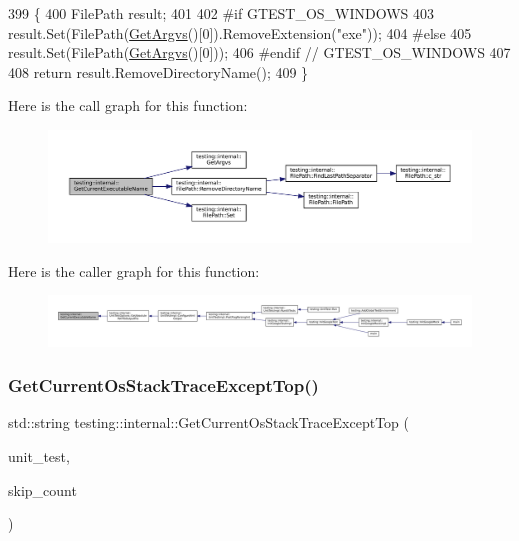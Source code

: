 \begin{DoxyCode}
399                                     \{
400   FilePath result;
401 
402 \textcolor{preprocessor}{#if GTEST\_OS\_WINDOWS}
403   result.Set(FilePath(\hyperlink{namespacetesting_1_1internal_a344160f771a3b754fa4e54b6e9846b23}{GetArgvs}()[0]).RemoveExtension(\textcolor{stringliteral}{"exe"}));
404 \textcolor{preprocessor}{#else}
405   result.Set(FilePath(\hyperlink{namespacetesting_1_1internal_a344160f771a3b754fa4e54b6e9846b23}{GetArgvs}()[0]));
406 \textcolor{preprocessor}{#endif  // GTEST\_OS\_WINDOWS}
407 
408   \textcolor{keywordflow}{return} result.RemoveDirectoryName();
409 \}
\end{DoxyCode}
Here is the call graph for this function\+:
\nopagebreak
\begin{figure}[H]
\begin{center}
\leavevmode
\includegraphics[width=350pt]{namespacetesting_1_1internal_a7a2bbf069f75bc99873976ad6fc356ad_cgraph}
\end{center}
\end{figure}
Here is the caller graph for this function\+:
\nopagebreak
\begin{figure}[H]
\begin{center}
\leavevmode
\includegraphics[width=350pt]{namespacetesting_1_1internal_a7a2bbf069f75bc99873976ad6fc356ad_icgraph}
\end{center}
\end{figure}
\mbox{\label{namespacetesting_1_1internal_aeb475922b8cd1e6c60ac052bbc396e62}} 
\subsubsection{\texorpdfstring{Get\+Current\+Os\+Stack\+Trace\+Except\+Top()}{GetCurrentOsStackTraceExceptTop()}}
{\footnotesize\ttfamily std\+::string testing\+::internal\+::\+Get\+Current\+Os\+Stack\+Trace\+Except\+Top (\begin{DoxyParamCaption}\item[{\hyperlink{classtesting_1_1UnitTest}{Unit\+Test} $\ast$}]{unit\+\_\+test,  }\item[{int}]{skip\+\_\+count }\end{DoxyParamCaption})}




